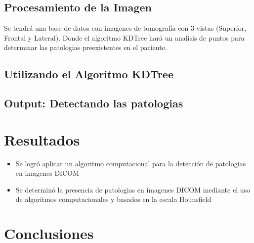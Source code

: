 \documentclass{article}
\begin{document}
\subsection{Procesamiento de la Imagen}

Se tendrá una base de datos con imagenes de tomografía con 3 vistas (Superior, Frontal y Lateral). Donde el algoritmo KDTree hará un analisis de puntos para determinar las patologias preexistentes en el paciente.

\subsection{Utilizando el Algoritmo KDTree}
\subsection{Output: Detectando las patologias}




	\section{Resultados}
	\begin{itemize}
		\item Se logró aplicar  un algoritmo computacional para la detección de patologias en imagenes DICOM
		\item Se determinó la presencia de patologias en imagenes DICOM mediante el uso de algoritmos computacionales y basados en la escala Hounsfield
		\end{itemize}
		


	\section{Conclusiones}


	
	
\end{document}
